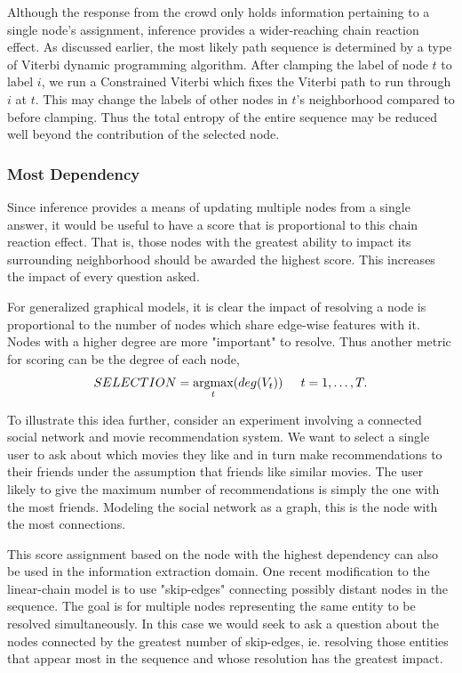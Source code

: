 Although the response from the crowd only holds information pertaining to a single node's assignment, inference provides a wider-reaching chain reaction effect.  As discussed earlier, the most likely path sequence is determined by a type of Viterbi dynamic programming algorithm.  After clamping the label of node $t$ to label $i$, we run a Constrained Viterbi \cite{Kristjansson:2004:IIE:1597148.1597216} which fixes the Viterbi path to run through $i$ at $t$.  This may change the labels of other nodes in $t$'s neighborhood compared to before clamping.  Thus the total entropy of the entire sequence may be reduced well beyond the contribution of the selected node.

\subsubsection{Most Dependency}
Since inference provides a means of updating multiple nodes from a single answer, it would be useful to have a score that is proportional to this chain reaction effect.  That is, those nodes with the greatest ability to impact its surrounding neighborhood should be awarded the highest score.  This increases the impact of every question asked. 

For generalized graphical models, it is clear the impact of resolving a node is proportional to the number of nodes which share edge-wise features with it.  Nodes with a higher degree are more "important" to resolve.  Thus another metric for scoring can be the degree of each node,
\begin{equation}
SELECTION = \argmax_{t}(deg(V_{t})) \hspace{.2in} t=1,\dots,T.
\end{equation}

To illustrate this idea further, consider an experiment involving a connected social network and movie recommendation system.  We want to select a single user to ask about which movies they like and in turn make recommendations to their friends under the assumption that friends like similar movies.  The user likely to give the maximum number of recommendations is simply the one with the most friends.  Modeling the social network as a graph, this is the node with the most connections.

This score assignment based on the node with the highest dependency can also be used in the information extraction domain.  One recent modification to the linear-chain model is to use "skip-edges" \cite{Sutton04} connecting possibly distant nodes in the sequence.  The goal is for multiple nodes representing the same entity to be resolved simultaneously.  In this case we would seek to ask a question about the nodes connected by the greatest number of skip-edges, ie. resolving those entities that appear most in the sequence and whose resolution has the greatest impact.

